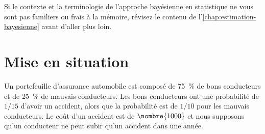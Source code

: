 Si le contexte et la terminologie de l'approche bayésienne en
statistique ne vous sont pas familiers ou frais à la mémoire, révisez
le contenu de l'\autoref{chap:estimation-bayesienne} avant d'aller
plus loin.


\section{Mise en situation}
\label{sec:bayesienne:mise}

Un portefeuille d'assurance automobile est composé de 75~\% de bons
conducteurs et de 25~\% de mauvais conducteurs. Les bons conducteurs
ont une probabilité de $1/15$ d'avoir un accident, alors que la
probabilité est de $1/10$ pour les mauvais conducteurs. Le coût d'un
accident est de $\nombre{1000}$ et nous supposons qu'un conducteur ne
peut subir qu'un accident dans une année.

